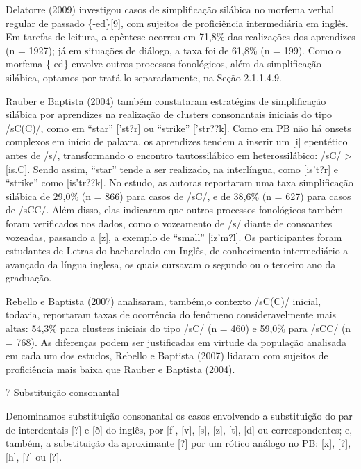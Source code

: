 Delatorre (2009) investigou casos de simplifica\c{c}\~ao sil\'abica no morfema
verbal regular de passado \{-ed\}{[}9{]}, com sujeitos de profici\^encia
intermedi\'aria em ingl\^es. Em tarefas de leitura, a ep\^entese ocorreu em
71,8\% das realiza\c{c}\~oes dos aprendizes (n = 1927); j\'a em situa\c{c}\~oes de
di\'alogo, a taxa foi de 61,8\% (n = 199). Como o morfema \{-ed\} envolve
outros processos fonol\'ogicos, al\'em da simplifica\c{c}\~ao sil\'abica, optamos
por trat\'a-lo separadamente, na Se\c{c}\~ao 2.1.1.4.9.

Rauber e Baptista (2004) tamb\'em constataram estrat\'egias de simplifica\c{c}\~ao
sil\'abica por aprendizes na realiza\c{c}\~ao de clusters consonantais iniciais
do tipo /sC(C)/, como em ``star'' {[}'st?r{]} ou ``strike''
{[}'str??k{]}. Como em PB n\~ao h\'a onsets complexos em in\'icio de palavra,
os aprendizes tendem a inserir um {[}i{]} epent\'etico antes de /s/,
transformando o encontro tautossil\'abico em heterossil\'abico: /sC/
\textgreater{} {[}is.C{]}. Sendo assim, ``star'' tende a ser realizado,
na interl\'ingua, como {[}is't?r{]} e ``strike'' como {[}is'tr??k{]}. No
estudo, as autoras reportaram uma taxa simplifica\c{c}\~ao sil\'abica de 29,0\%
(n = 866) para casos de /sC/, e de 38,6\% (n = 627) para casos de /sCC/.
Al\'em disso, elas indicaram que outros processos fonol\'ogicos tamb\'em foram
verificados nos dados, como o vozeamento de /s/ diante de consoantes
vozeadas, passando a {[}z{]}, a exemplo de ``small'' {[}iz'm?l{]}. Os
participantes foram estudantes de Letras do bacharelado em Ingl\^es, de
conhecimento intermedi\'ario a avan\c{c}ado da l\'ingua inglesa, os quais
cursavam o segundo ou o terceiro ano da gradua\c{c}\~ao.

Rebello e Baptista (2007) analisaram, tamb\'em,o contexto /sC(C)/ inicial,
todavia, reportaram taxas de ocorr\^encia do fen\^omeno consideravelmente
mais altas: 54,3\% para clusters iniciais do tipo /sC/ (n = 460) e
59,0\% para /sCC/ (n = 768). As diferen\c{c}as podem ser justificadas em
virtude da popula\c{c}\~ao analisada em cada um dos estudos, Rebello e
Baptista (2007) lidaram com sujeitos de profici\^encia mais baixa que
Rauber e Baptista (2004).

7 Substitui\c{c}\~ao consonantal

Denominamos substitui\c{c}\~ao consonantal os casos envolvendo a substitui\c{c}\~ao
do par de interdentais {[}?{]} e {[}ð{]} do ingl\^es, por {[}f{]},
{[}v{]}, {[}s{]}, {[}z{]}, {[}t{]}, {[}d{]} ou correspondentes; e,
tamb\'em, a substitui\c{c}\~ao da aproximante {[}?{]} por um r\'otico an\'alogo no
PB: {[}x{]}, {[}?{]}, {[}h{]}, {[}?{]} ou {[}?{]}.

